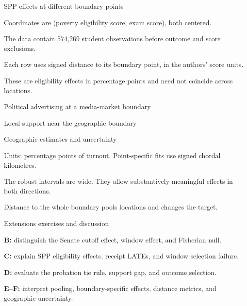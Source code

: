 \begin{frame}{SPP effects at different boundary points}

\begin{items}
\item Coordinates are (poverty eligibility score, exam score), both centered.
\item The data contain 574,269 student observations before outcome and score exclusions.
\item Each row uses signed distance to its boundary point, in the authors' score units.
\item These are eligibility effects in percentage points and need not coincide across locations.
\end{items}
\end{frame}

\begin{frame}{Political advertising at a media-market boundary}
\end{frame}

\begin{frame}{Local support near the geographic boundary}
\end{frame}

\begin{frame}{Geographic estimates and uncertainty}

\begin{items}
\item Units: percentage points of turnout. Point-specific fits use signed chordal kilometres.
\item The robust intervals are wide. They allow substantively meaningful effects in both directions.
\item Distance to the whole boundary pools locations and changes the target.
\end{items}
\end{frame}

\begin{frame}{Extensions exercises and discussion}
\begin{items}
\item \textbf{B:} distinguish the Senate cutoff effect, window effect, and Fisherian null.
\item \textbf{C:} explain SPP eligibility effects, receipt LATEs, and window selection failure.
\item \textbf{D:} evaluate the probation tie rule, support gap, and outcome selection.
\item \textbf{E--F:} interpret pooling, boundary-specific effects, distance metrics, and geographic uncertainty.
\end{items}
\end{frame}
